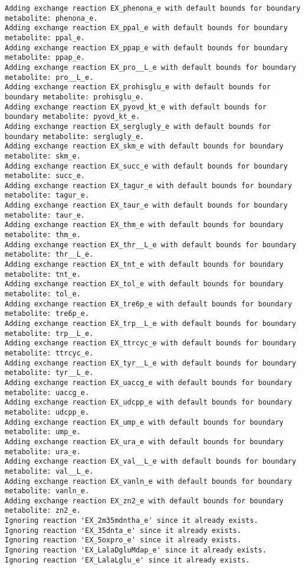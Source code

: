 \documentclass[
  letterpaper,
  DIV=11,
  numbers=noendperiod]{scrartcl}
\begin{document}
\begin{verbatim}
Adding exchange reaction EX_phenona_e with default bounds for boundary metabolite: phenona_e.
Adding exchange reaction EX_ppal_e with default bounds for boundary metabolite: ppal_e.
Adding exchange reaction EX_ppap_e with default bounds for boundary metabolite: ppap_e.
Adding exchange reaction EX_pro__L_e with default bounds for boundary metabolite: pro__L_e.
Adding exchange reaction EX_prohisglu_e with default bounds for boundary metabolite: prohisglu_e.
Adding exchange reaction EX_pyovd_kt_e with default bounds for boundary metabolite: pyovd_kt_e.
Adding exchange reaction EX_serglugly_e with default bounds for boundary metabolite: serglugly_e.
Adding exchange reaction EX_skm_e with default bounds for boundary metabolite: skm_e.
Adding exchange reaction EX_succ_e with default bounds for boundary metabolite: succ_e.
Adding exchange reaction EX_tagur_e with default bounds for boundary metabolite: tagur_e.
Adding exchange reaction EX_taur_e with default bounds for boundary metabolite: taur_e.
Adding exchange reaction EX_thm_e with default bounds for boundary metabolite: thm_e.
Adding exchange reaction EX_thr__L_e with default bounds for boundary metabolite: thr__L_e.
Adding exchange reaction EX_tnt_e with default bounds for boundary metabolite: tnt_e.
Adding exchange reaction EX_tol_e with default bounds for boundary metabolite: tol_e.
Adding exchange reaction EX_tre6p_e with default bounds for boundary metabolite: tre6p_e.
Adding exchange reaction EX_trp__L_e with default bounds for boundary metabolite: trp__L_e.
Adding exchange reaction EX_ttrcyc_e with default bounds for boundary metabolite: ttrcyc_e.
Adding exchange reaction EX_tyr__L_e with default bounds for boundary metabolite: tyr__L_e.
Adding exchange reaction EX_uaccg_e with default bounds for boundary metabolite: uaccg_e.
Adding exchange reaction EX_udcpp_e with default bounds for boundary metabolite: udcpp_e.
Adding exchange reaction EX_ump_e with default bounds for boundary metabolite: ump_e.
Adding exchange reaction EX_ura_e with default bounds for boundary metabolite: ura_e.
Adding exchange reaction EX_val__L_e with default bounds for boundary metabolite: val__L_e.
Adding exchange reaction EX_vanln_e with default bounds for boundary metabolite: vanln_e.
Adding exchange reaction EX_zn2_e with default bounds for boundary metabolite: zn2_e.
Ignoring reaction 'EX_2m35mdntha_e' since it already exists.
Ignoring reaction 'EX_35dnta_e' since it already exists.
Ignoring reaction 'EX_5oxpro_e' since it already exists.
Ignoring reaction 'EX_LalaDgluMdap_e' since it already exists.
Ignoring reaction 'EX_LalaLglu_e' since it already exists.

\end{verbatim}
\end{document}
